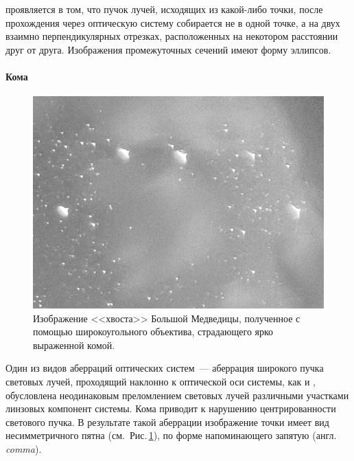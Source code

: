  проявляется в том, что пучок лучей, исходящих из какой-либо точки, после прохождения через оптическую систему собирается не в одной точке, а на двух взаимно перпендикулярных отрезках, расположенных на некотором расстоянии друг от друга. Изображения промежуточных сечений имеют форму эллипсов.

\paragraph{Кома}

\begin{figure}
	\centering
	\vspace{-1pc}
	\includegraphics[width=0.4\tw]{img/optics-aberrations-coma.jpg}
	\caption{Изображение <<хвоста>> Большой Медведицы, полученное с помощью широкоугольного объектива, страдающего ярко выраженной комой.}
	\label{pic:optics-aberrations-coma}
\end{figure}
Один из видов аберраций оптических систем~--- аберрация широкого пучка световых лучей, проходящий наклонно к оптической оси системы, как и , обусловлена неодинаковым преломлением световых лучей различными участками линзовых компонент системы. Кома приводит к нарушению центрированности светового пучка. В результате такой аберрации изображение точки имеет вид несимметричного пятна (см.~Рис.\,\ref{pic:optics-aberrations-coma}), по форме напоминающего запятую (англ. {\itshape comma}).

